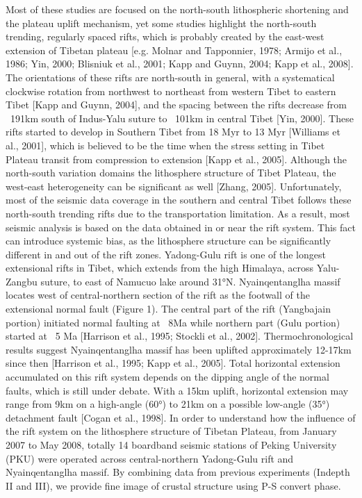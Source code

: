 Most of these studies are focused on the north-south lithospheric shortening and the plateau uplift mechanism, yet some studies highlight the north-south trending, regularly spaced rifts, which is probably created by the east-west extension of Tibetan plateau [e.g. Molnar and Tapponnier, 1978; Armijo et al., 1986; Yin, 2000; Blisniuk et al., 2001; Kapp and Guynn, 2004; Kapp et al., 2008]. The orientations of these rifts are north-south in general, with a systematical clockwise rotation from northwest to northeast from western Tibet to eastern Tibet [Kapp and Guynn, 2004], and the spacing between the rifts decrease from ~191km south of Indus-Yalu suture to ~101km in central Tibet [Yin, 2000]. These rifts started to develop in Southern Tibet from 18 Myr to 13 Myr [Williams et al., 2001], which is believed to be the time when the stress setting in Tibet Plateau transit from compression to extension [Kapp et al., 2005]. 
Although the north-south variation domains the lithosphere structure of Tibet Plateau, the west-east heterogeneity can be significant as well [Zhang, 2005]. Unfortunately, most of the seismic data coverage in the southern and central Tibet follows these north-south trending rifts due to the transportation limitation. As a result, most seismic analysis is based on the data obtained in or near the rift system. This fact can introduce systemic bias, as the lithosphere structure can be significantly different in and out of the rift zones.
Yadong-Gulu rift is one of the longest extensional rifts in Tibet, which extends from the high Himalaya, across Yalu-Zangbu suture, to east of Namucuo lake around 31°N. Nyainqentanglha massif locates west of central-northern section of the rift as the footwall of the extensional normal fault (Figure 1). The central part of the rift (Yangbajain portion) initiated normal faulting at ~8Ma while northern part (Gulu portion) started at ~5 Ma [Harrison et al., 1995; Stockli et al., 2002]. Thermochronological results suggest Nyainqentanglha massif has been uplifted approximately 12-17km since then [Harrison et al., 1995; Kapp et al., 2005]. Total horizontal extension accumulated on this rift system depends on the dipping angle of the normal faults, which is still under debate. With a 15km uplift, horizontal extension may range from 9km on a high-angle (60°) to 21km on a possible low-angle (35°) detachment fault [Cogan et al., 1998]. 
In order to understand how the influence of the rift system on the lithosphere structure of Tibetan Plateau, from January 2007 to May 2008, totally 14 boardband seismic stations of Peking University (PKU) were operated across central-northern Yadong-Gulu rift and Nyainqentanglha massif. By combining data from previous experiments (Indepth II and III), we provide fine image of crustal structure using P-S convert phase.
